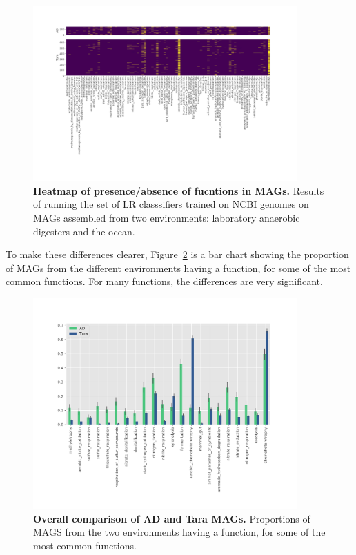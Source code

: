 \documentclass[10pt,letterpaper]{article}
\begin{document}
\begin{figure}
\includegraphics[width=0.9\textwidth]{mag_heatmaps.pdf}
\caption{{\bf Heatmap of presence/absence of fucntions in MAGs.}
Results of running the set of LR classsifiers trained on NCBI genomes on MAGs assembled from two environments: laboratory anaerobic digesters and the ocean.}
\label{heatmap}
\end{figure}

To make these differences clearer, Figure~\ref{mag-compare} is a bar chart showing the proportion of MAGs from the different environments having a function, for some of the most common functions. For many functions, the differences are very significant. 

\begin{figure}
\includegraphics[width=0.9\textwidth]{mag_comparison_bars}
\caption{{\bf Overall comparison of AD and Tara MAGs.}
Proportions of MAGS from the two environments having a function, for some of the most common functions.}
\label{mag-compare}
\end{figure}
\end{document}
